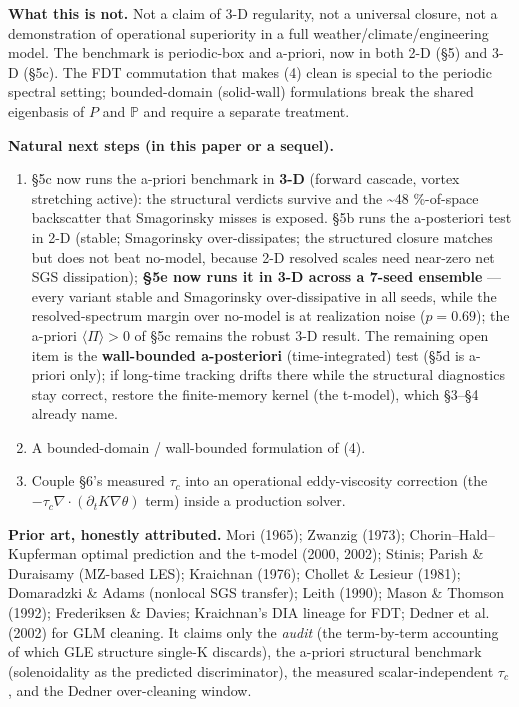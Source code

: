 \documentclass[11pt]{article}
\begin{document}
\textbf{What this is not.} Not a claim of 3-D regularity, not a universal closure, not a demonstration of operational superiority in a full weather/climate/engineering model. The benchmark is periodic-box and a-priori, now in both 2-D (§5) and 3-D (§5c). The FDT commutation that makes (4) clean is special to the periodic spectral setting; bounded-domain (solid-wall) formulations break the shared eigenbasis of $P$ and $\mathbb{P}$ and require a separate treatment.


\textbf{Natural next steps (in this paper or a sequel).}

\begin{enumerate}
\item §5c now runs the a-priori benchmark in \textbf{3-D} (forward cascade, vortex stretching active): the structural verdicts survive and the \textasciitilde{}48 \%-of-space backscatter that Smagorinsky misses is exposed. §5b runs the a-posteriori test in 2-D (stable; Smagorinsky over-dissipates; the structured closure matches but does not beat no-model, because 2-D resolved scales need near-zero net SGS dissipation); \textbf{§5e now runs it in 3-D across a 7-seed ensemble} --- every variant stable and Smagorinsky over-dissipative in all seeds, while the resolved-spectrum margin over no-model is at realization noise ($p=0.69$); the a-priori $\langle\Pi\rangle>0$ of §5c remains the robust 3-D result. The remaining open item is the \textbf{wall-bounded a-posteriori} (time-integrated) test (§5d is a-priori only); if long-time tracking drifts there while the structural diagnostics stay correct, restore the finite-memory kernel (the t-model), which §3–§4 already name.
\item A bounded-domain / wall-bounded formulation of (4).
\item Couple §6's measured $\tau _{c}$ into an operational eddy-viscosity correction (the $-\tau _{c}\nabla \cdot (\partial _{t} K\nabla \theta )$ term) inside a production solver.
\end{enumerate}


\textbf{Prior art, honestly attributed.} Mori (1965); Zwanzig (1973); Chorin–Hald–Kupferman optimal prediction and the t-model (2000, 2002); Stinis; Parish \& Duraisamy (MZ-based LES); Kraichnan (1976); Chollet \& Lesieur (1981); Domaradzki \& Adams (nonlocal SGS transfer); Leith (1990); Mason \& Thomson (1992); Frederiksen \& Davies; Kraichnan's DIA lineage for FDT; Dedner et al. (2002) for GLM cleaning. It claims only the \emph{audit} (the term-by-term accounting of which GLE structure single-K discards), the a-priori structural benchmark (solenoidality as the predicted discriminator), the measured scalar-independent $\tau _{c}$, and the Dedner over-cleaning window.
\end{document}
